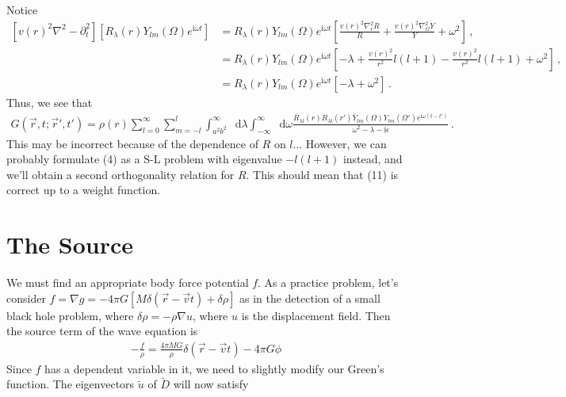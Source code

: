 \documentclass{article}
\newcommand*\diff{\mathop{}\!\mathrm{d}}
\newcommand*\te[1]{\text{#1}}
\newcommand*\ps[1]{\left[#1\right]}
\newcommand*\f[2]{\frac{#1}{#2}}
\newcommand*\I{\te{i}}
\begin{document}
Notice
\begin{align}
\ps{v(r)^2\nabla^2-\partial_t^2}\ps{R_\lambda(r)Y_{lm}(\Omega)e^{\I\omega t}}&=R_\lambda(r)Y_{lm}(\Omega)e^{\I\omega t}\ps{\f{v(r)^2\nabla_r^2R}{R}+\f{v(r)^2\nabla_\Omega^2Y}{Y}+\omega^2}\,,\\
&=R_\lambda(r)Y_{lm}(\Omega)e^{\I\omega t}\ps{-\lambda+\f{v(r)^2}{r^2}l(l+1)-\f{v(r)^2}{r^2}l(l+1)+\omega^2}\,,\\
&=R_\lambda(r)Y_{lm}(\Omega)e^{\I\omega t}\ps{-\lambda+\omega^2}\,.
\end{align}
Thus, we see that
\begin{align}
G(\vec r,t;\vec r',t')=\rho(r)\sum_{l=0}^\infty\sum_{m=-l}^l\int_{a^2b^2}^{\infty}\diff\lambda\int_{-\infty}^\infty\diff\omega\f{\bar R_{\lambda l}(r)R_{\lambda l}(r')\bar Y_{lm}(\Omega)Y_{lm}(\Omega') e^{\I\omega(t-t')}}{\omega^2-\lambda-\I\epsilon}\,.
\end{align}
This may be incorrect because of the dependence of $R$ on $l$... However, we can probably formulate (4) as a S-L problem with eigenvalue $-l(l+1)$ instead, and we'll obtain a second orthogonality relation for $R$. This should mean that (11) is correct up to a weight function.




\section{The Source}
We must find an appropriate body force potential $f$. As a practice problem, let's consider $f=\nabla g=-4\pi G\ps{M\delta(\vec r-\vec vt)+\delta\rho}$ as in the detection of a small black hole problem, where $\delta\rho=-\rho\nabla u$, where $u$ is the displacement field. Then the source term of the wave equation is
\begin{align}
-\f f\rho=\f{4\pi M G}{\rho}\delta(\vec r-\vec vt)-4\pi G\phi
\end{align}
Since $f$ has a dependent variable in it, we need to slightly modify our Green's function. The eigenvectors $\tilde u$ of $\tilde D$ will now satisfy
\end{document}
